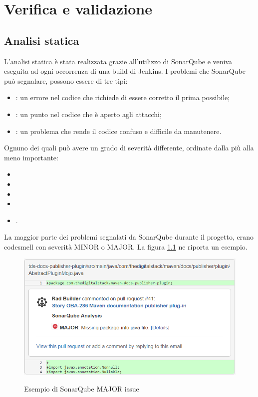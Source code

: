 
\chapter{Verifica e validazione}
\label{cap:testing} 

\section{Analisi statica}
L'analisi statica è stata realizzata grazie all'utilizzo di SonarQube \cite{site:sonarqube} e veniva eseguita ad ogni occorrenza di una build di Jenkins.
I problemi che SonarQube può segnalare, possono essere di tre tipi:
\begin{itemize}
    \item {}: un errore nel codice che richiede di essere corretto il prima possibile;
    \item {}: un punto nel codice che è aperto agli attacchi;
    \item {}:  un problema che rende il codice confuso e difficile da manutenere.
\end{itemize}
Ognuno dei quali può avere un grado di severità differente, ordinate dalla più alla meno importante:
\begin{itemize}
    \item {}
    \item {}
    \item {}
    \item {}
    \item {}.
\end{itemize}

La maggior parte dei problemi segnalati da SonarQube durante il progetto, erano codesmell con severità MINOR o MAJOR.
La figura \ref{sonarMAJORissue} ne riporta un esempio.

\clearpage

\begin{figure}[H]
    \centering
    \includegraphics[width=\textwidth]{immagini/major-issue.png}\\
    \caption{Esempio di SonarQube MAJOR issue}
    \label{sonarMAJORissue}
\end{figure}

